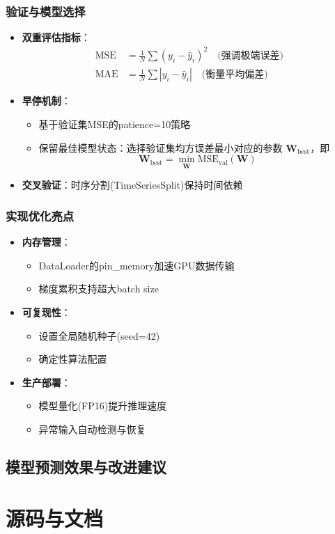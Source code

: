 \documentclass[a4paper,11pt]{ctexart}
\begin{document}
\subsubsection{验证与模型选择}
\begin{itemize}
\item \textbf{双重评估指标}：
  \begin{align*}
  \text{MSE} &= \frac{1}{N}\sum(y_i-\hat{y}_i)^2 \quad \text{(强调极端误差)} \\
  \text{MAE} &= \frac{1}{N}\sum|y_i-\hat{y}_i| \quad \text{(衡量平均偏差)}
  \end{align*}
  
  \item \textbf{早停机制}：
  \begin{itemize}
  \item 基于验证集MSE的patience=10策略
    \item 保留最佳模型状态：选择验证集均方误差最小对应的参数 $\mathbf{W}_{\text{best}}$，即
        \[
        \mathbf{W}_{\text{best}} = \min_{\mathbf{W}} \text{MSE}_{\text{val}}(\mathbf{W})
        \]
  \end{itemize}
\item \textbf{交叉验证}：时序分割(TimeSeriesSplit)保持时间依赖
\end{itemize}

\subsubsection{实现优化亮点}
\begin{itemize}
\item \textbf{内存管理}：
  \begin{itemize}
  \item DataLoader的pin\_memory加速GPU数据传输
  \item 梯度累积支持超大batch size
  \end{itemize}
  
\item \textbf{可复现性}：
  \begin{itemize}
  \item 设置全局随机种子(seed=42)
  \item 确定性算法配置
  \end{itemize}
  
\item \textbf{生产部署}：
  \begin{itemize}
  \item 模型量化(FP16)提升推理速度
  \item 异常输入自动检测与恢复
  \end{itemize}
\end{itemize}

\newpage
\subsection{模型预测效果与改进建议}

\newpage

\section{源码与文档}
\end{document}
